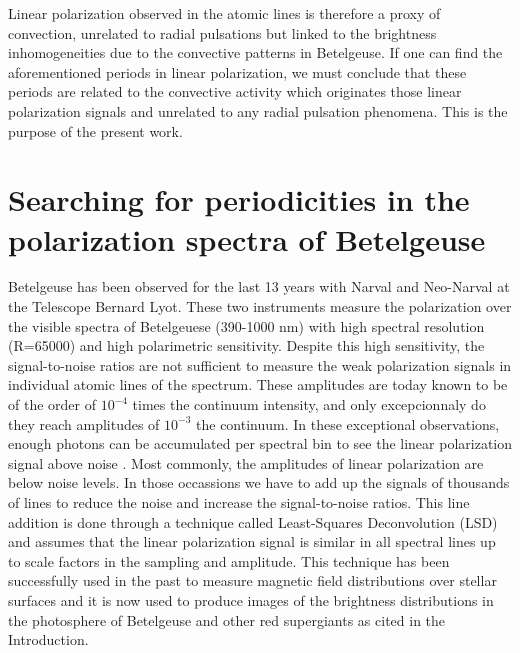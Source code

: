 \documentclass{aa}
\begin{document}
Linear polarization observed in the atomic lines is therefore a proxy of convection, unrelated to radial 
pulsations but linked to the brightness inhomogeneities due to the convective patterns in Betelgeuse. If one can find the aforementioned periods 
in linear polarization, we must conclude that these periods are related to the convective activity which originates those linear polarization signals
and unrelated to any radial pulsation phenomena. This is the purpose of the present work.



\section{Searching for periodicities in the polarization spectra of Betelgeuse}

Betelgeuse has been observed for the last 13 years with Narval and Neo-Narval at the Telescope Bernard Lyot. These two instruments measure the polarization 
over the visible spectra of Betelgeuese (390-1000 nm) with high spectral resolution (R=65000) and high polarimetric sensitivity. Despite 
this high sensitivity, the signal-to-noise ratios are not sufficient to measure the weak polarization signals in individual atomic lines of the 
spectrum. These amplitudes are today known to be of the order of $10^{-4}$ times the continuum intensity, and only excepcionnaly do they 
reach amplitudes of $10^{-3}$ the continuum. In these exceptional observations, enough photons can be accumulated per spectral bin to 
see the linear polarization signal above noise \citep{auriere_discovery_2016}. Most commonly, the amplitudes of linear polarization are below noise levels. In those 
occassions we have to add up the signals of thousands of lines to reduce the noise and increase the signal-to-noise ratios. This line addition 
is done through a technique called Least-Squares Deconvolution (LSD) \citep{donati_spectropolarimetric_1997} and assumes that the 
linear polarization signal is similar 
in all spectral lines up to scale factors in the sampling and amplitude. This technique has been successfully used in the past to measure 
magnetic field distributions over stellar surfaces and it is now used to produce images of the brightness distributions in the photosphere 
of Betelgeuse and other red supergiants as cited in the Introduction. 
\end{document}
